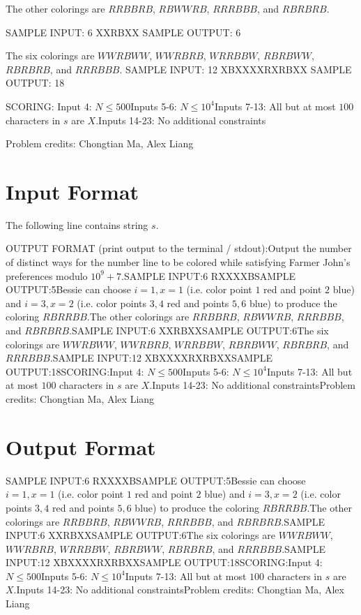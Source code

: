 \documentclass[12pt]{article}
\begin{document}
The other colorings are $RRBBRB$, $RBWWRB$, $RRRBBB$, and
$RBRBRB$.

SAMPLE INPUT:
6
XXRBXX
SAMPLE OUTPUT: 
6

The six colorings are $WWRBWW$, $WWRBRB$, $WRRBBW$, $RBRBWW$, $RBRBRB$, and $RRRBBB$.
SAMPLE INPUT:
12
XBXXXXRXRBXX
SAMPLE OUTPUT: 
18

SCORING:
Input 4: $N\le 500$Inputs 5-6: $N\le 10^4$Inputs 7-13: All but at most $100$ characters in $s$ are
$X$.Inputs 14-23: No additional constraints


Problem credits: Chongtian Ma, Alex Liang



\section*{Input Format}
The following line contains string $s$.

OUTPUT FORMAT (print output to the terminal / stdout):Output the number of distinct ways for the number line to be colored while
satisfying Farmer John's preferences modulo
$10^9+7$.SAMPLE INPUT:6
RXXXXBSAMPLE OUTPUT:5Bessie can choose $i=1,x=1$ (i.e. color point $1$ red and point $2$ blue) and
$i=3,x=2$ (i.e. color points $3,4$ red and points $5,6$ blue) to produce the
coloring $RBRRBB$.The other colorings are $RRBBRB$, $RBWWRB$, $RRRBBB$, and
$RBRBRB$.SAMPLE INPUT:6
XXRBXXSAMPLE OUTPUT:6The six colorings are $WWRBWW$, $WWRBRB$, $WRRBBW$, $RBRBWW$, $RBRBRB$, and $RRRBBB$.SAMPLE INPUT:12
XBXXXXRXRBXXSAMPLE OUTPUT:18SCORING:Input 4: $N\le 500$Inputs 5-6: $N\le 10^4$Inputs 7-13: All but at most $100$ characters in $s$ are
$X$.Inputs 14-23: No additional constraintsProblem credits: Chongtian Ma, Alex Liang

\section*{Output Format}
SAMPLE INPUT:6
RXXXXBSAMPLE OUTPUT:5Bessie can choose $i=1,x=1$ (i.e. color point $1$ red and point $2$ blue) and
$i=3,x=2$ (i.e. color points $3,4$ red and points $5,6$ blue) to produce the
coloring $RBRRBB$.The other colorings are $RRBBRB$, $RBWWRB$, $RRRBBB$, and
$RBRBRB$.SAMPLE INPUT:6
XXRBXXSAMPLE OUTPUT:6The six colorings are $WWRBWW$, $WWRBRB$, $WRRBBW$, $RBRBWW$, $RBRBRB$, and $RRRBBB$.SAMPLE INPUT:12
XBXXXXRXRBXXSAMPLE OUTPUT:18SCORING:Input 4: $N\le 500$Inputs 5-6: $N\le 10^4$Inputs 7-13: All but at most $100$ characters in $s$ are
$X$.Inputs 14-23: No additional constraintsProblem credits: Chongtian Ma, Alex Liang
\end{document}
